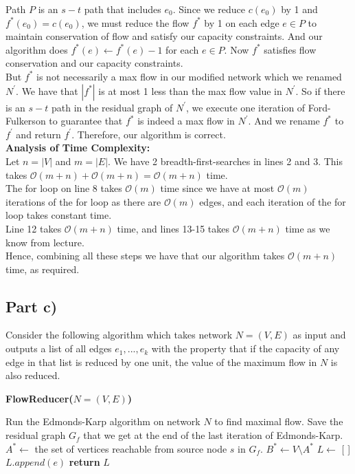 \documentclass[12pt]{article}
\begin{document}
Path $P$ is an $s-t$ path that includes $e_0$. Since we reduce $c(e_0)$ by 1 and $f^*(e_0) = c(e_0)$, we must reduce the flow $f^*$ by 1 on each edge $e \in P$ to maintain conservation of flow and satisfy our capacity constraints. And our algorithm does $f^*(e) \gets f^*(e) - 1$ for each $e \in P$. Now $f^*$ satisfies flow conservation and our capacity constraints. \\

But $f^*$ is not necessarily a max flow in our modified network which we renamed $N^\prime$. We have that $|f^*|$ is at most 1 less than the max flow value in $N^\prime$. So if there is an $s-t$ path in the residual graph of $N^\prime$, we execute one iteration of Ford-Fulkerson to guarantee that $f^*$ is indeed a max flow in $N^\prime$. And we rename $f^*$ to $f^\prime$ and return $f^\prime$. Therefore, our algorithm is correct. \\

\textbf{Analysis of Time Complexity:} \\

Let $n = |V|$ and $m = |E|$. We have 2 breadth-first-searches in lines 2 and 3. This takes $\mathcal{O}(m+n) + \mathcal{O}(m+n) = \mathcal{O}(m+n)$ time. \\

The for loop on line 8 takes $\mathcal{O}(m)$ time since we have at most $\mathcal{O}(m)$ iterations of the for loop as there are $\mathcal{O}(m)$ edges, and each iteration of the for loop takes constant time. \\

Line 12 takes $\mathcal{O}(m+n)$ time, and lines 13-15 takes $\mathcal{O}(m+n)$ time as we know from lecture. \\

Hence, combining all these steps we have that our algorithm takes $\mathcal{O}(m + n)$ time, as required. 

\subsection*{Part c)}

Consider the following algorithm which takes network $N = (V,E)$ as input and outputs a list of all edges $e_1,...,e_k$ with the property that if the capacity of any edge in that list is reduced by one unit, the value of the maximum flow in $N$ is also reduced. 

\begin{algorithm}[hbt!]
\caption{\textbf{FlowReducer($N = (V,E)$)}}\label{alg:cap}

\begin{algorithmic}[1]
\State Run the Edmonds-Karp algorithm on network $N$ to find maximal flow. Save the residual graph $G_f$ that we get at the end of the last iteration of Edmonds-Karp. 
\State
\State $A^* \gets$ the set of vertices reachable from source node $s$ in $G_f$. 
\State $B^* \gets V \setminus A^*$
\State
\State $L \gets$ [ ]
        \State $L.append(e)$
    \EndIf
\EndFor
\State
\State \textbf{return} $L$
\end{algorithmic}
\end{algorithm}
\end{document}
